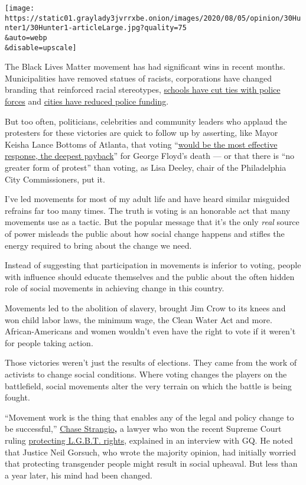 \texttt{[image: https://static01.graylady3jvrrxbe.onion/images/2020/08/05/opinion/30Hunter1/30Hunter1-articleLarge.jpg?quality=75\\\&auto=webp\\\&disable=upscale]}

The Black Lives Matter movement has had significant wins in recent
months. Municipalities have removed statues of racists, corporations
have changed branding that reinforced racial stereotypes,
\href{https://www.nytimes3xbfgragh.onion/2020/06/12/us/schools-police-resource-officers.html}{schools
have cut ties with police forces} and
\href{https://www.nytimes3xbfgragh.onion/2020/06/08/us/unrest-defund-police.html}{cities
have reduced police funding}.

But too often, politicians, celebrities and community leaders who
applaud the protesters for these victories are quick to follow up by
asserting, like Mayor Keisha Lance Bottoms of Atlanta, that voting
``\href{https://www.nytimes3xbfgragh.onion/2020/06/03/opinion/police-protests-atlanta-keisha-bottoms.html}{would
be the most effective response, the deepest payback}'' for George
Floyd's death --- or that there is ``no greater form of protest'' than
voting, as Lisa Deeley, chair of the Philadelphia City Commissioners,
put it.

I've led movements for most of my adult life and have heard similar
misguided refrains far too many times. The truth is voting is an
honorable act that many movements use as a tactic. But the popular
message that it's the only \emph{real} source of power misleads the
public about how social change happens and stifles the energy required
to bring about the change we need.

Instead of suggesting that participation in movements is inferior to
voting, people with influence should educate themselves and the public
about the often hidden role of social movements in achieving change in
this country.

Movements led to the abolition of slavery, brought Jim Crow to its knees
and won child labor laws, the minimum wage, the Clean Water Act and
more. African-Americans and women wouldn't even have the right to vote
if it weren't for people taking action.

Those victories weren't just the results of elections. They came from
the work of activists to change social conditions. Where voting changes
the players on the battlefield, social movements alter the very terrain
on which the battle is being fought.

``Movement work is the thing that enables any of the legal and policy
change to be successful,''
\href{https://www.gq.com/story/chase-strangio-aclu-lgbtq-legal-victory}{Chase
Strangio}\textbf{,} a lawyer who won the recent Supreme Court ruling
\href{https://www.nytimes3xbfgragh.onion/2020/06/15/us/gay-transgender-workers-supreme-court.html}{protecting
L.G.B.T. rights}, explained in an interview with GQ. He noted that
Justice Neil Gorsuch, who wrote the majority opinion, had initially
worried that protecting transgender people might result in social
upheaval. But less than a year later, his mind had been changed.

